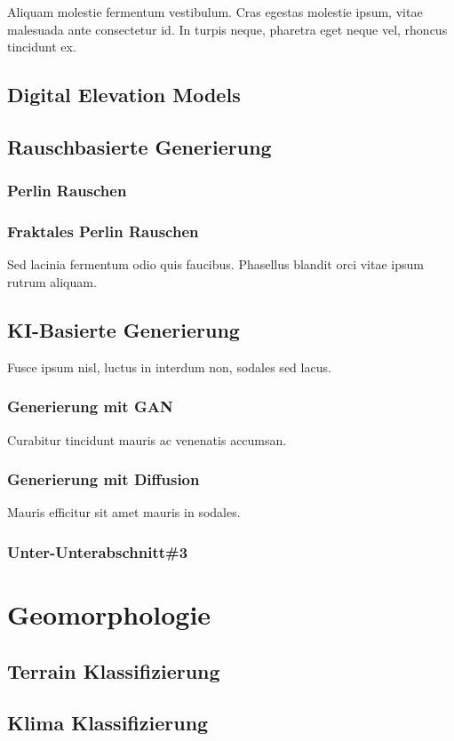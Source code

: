 Aliquam molestie fermentum vestibulum. Cras egestas molestie ipsum, vitae malesuada ante consectetur id. In turpis neque, pharetra eget neque vel, rhoncus tincidunt ex. 

\subsection{Digital Elevation Models}

\subsection{Rauschbasierte Generierung}


\subsubsection{Perlin Rauschen}

\subsubsection{Fraktales Perlin Rauschen}

Sed lacinia fermentum odio quis faucibus. Phasellus blandit orci vitae ipsum rutrum aliquam. 

\subsection{KI-Basierte Generierung}

Fusce ipsum nisl, luctus in interdum non, sodales sed lacus. 

\subsubsection{Generierung mit GAN}

Curabitur tincidunt mauris ac venenatis accumsan. 

\subsubsection{Generierung mit Diffusion}

Mauris efficitur sit amet mauris in sodales. 

\subsubsection{Unter-Unterabschnitt\#3}


\section{Geomorphologie}


\subsection{Terrain Klassifizierung}

\subsection{Klima Klassifizierung}

